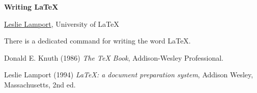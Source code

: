 \documentclass[a4paper, 11pt]{article}
\newcommand{\abstracttitle}[1]{{
    \centering
    \LARGE \textbf{#1}\\
    \vspace*{0.7cm}
}}
\newcommand{\firstauthor}[2]{{
    \centering
    \underline{#1}, \textsf{#2}\\
    \vspace*{0.25cm}
}}
\newcommand{\abstracttext}[1]{
    \vspace{0.6cm}
    #1
}
\begin{document}
\abstracttitle{Writing \LaTeX}

\firstauthor{Leslie Lamport}{University of \LaTeX}

\abstracttext{
    There is a dedicated command for writing the word \LaTeX.
}

\begin{thebibliography}{9}
Donald E. Knuth (1986) \emph{The \TeX{} Book}, Addison-Wesley Professional.

Leslie Lamport (1994) \emph{\LaTeX: a document preparation system}, Addison
Wesley, Massachusetts, 2nd ed.
\end{thebibliography}
\end{document}
